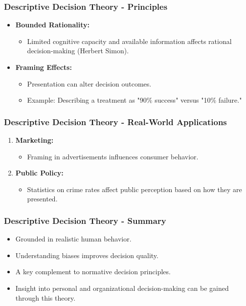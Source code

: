\documentclass[aspectratio=169]{beamer}
\begin{document}
\begin{frame}[fragile]
    \frametitle{Descriptive Decision Theory - Principles}
    \begin{itemize}
        \item \textbf{Bounded Rationality:} 
            \begin{itemize}
                \item Limited cognitive capacity and available information affects rational decision-making (Herbert Simon).
            \end{itemize}
        \item \textbf{Framing Effects:} 
            \begin{itemize}
                \item Presentation can alter decision outcomes.
                \item Example: Describing a treatment as "90\% success" versus "10\% failure."
            \end{itemize}
    \end{itemize}
\end{frame}

\begin{frame}[fragile]
    \frametitle{Descriptive Decision Theory - Real-World Applications}
    \begin{enumerate}
        \item \textbf{Marketing:} 
            \begin{itemize}
                \item Framing in advertisements influences consumer behavior.
            \end{itemize}
        \item \textbf{Public Policy:} 
            \begin{itemize}
                \item Statistics on crime rates affect public perception based on how they are presented.
            \end{itemize}
    \end{enumerate}
\end{frame}

\begin{frame}[fragile]
    \frametitle{Descriptive Decision Theory - Summary}
    \begin{itemize}
        \item Grounded in realistic human behavior.
        \item Understanding biases improves decision quality.
        \item A key complement to normative decision principles.
        \item Insight into personal and organizational decision-making can be gained through this theory.
    \end{itemize}
\end{frame}
\end{document}
